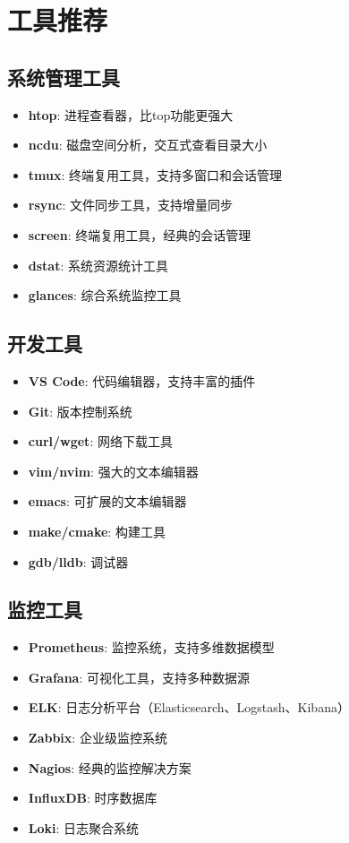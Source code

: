 \documentclass[12pt,UTF8]{ctexbook}
\begin{document}
\section{工具推荐}
\label{sec:tools-recommendation}

\subsection*{系统管理工具}

\begin{itemize}
    \item \textbf{htop}: 进程查看器，比top功能更强大
    \item \textbf{ncdu}: 磁盘空间分析，交互式查看目录大小
    \item \textbf{tmux}: 终端复用工具，支持多窗口和会话管理
    \item \textbf{rsync}: 文件同步工具，支持增量同步
    \item \textbf{screen}: 终端复用工具，经典的会话管理
    \item \textbf{dstat}: 系统资源统计工具
    \item \textbf{glances}: 综合系统监控工具
\end{itemize}

\subsection*{开发工具}

\begin{itemize}
    \item \textbf{VS Code}: 代码编辑器，支持丰富的插件
    \item \textbf{Git}: 版本控制系统
    \item \textbf{curl/wget}: 网络下载工具
    \item \textbf{vim/nvim}: 强大的文本编辑器
    \item \textbf{emacs}: 可扩展的文本编辑器
    \item \textbf{make/cmake}: 构建工具
    \item \textbf{gdb/lldb}: 调试器
\end{itemize}

\subsection*{监控工具}

\begin{itemize}
    \item \textbf{Prometheus}: 监控系统，支持多维数据模型
    \item \textbf{Grafana}: 可视化工具，支持多种数据源
    \item \textbf{ELK}: 日志分析平台（Elasticsearch、Logstash、Kibana）
    \item \textbf{Zabbix}: 企业级监控系统
    \item \textbf{Nagios}: 经典的监控解决方案
    \item \textbf{InfluxDB}: 时序数据库
    \item \textbf{Loki}: 日志聚合系统
\end{itemize}
\end{document}
